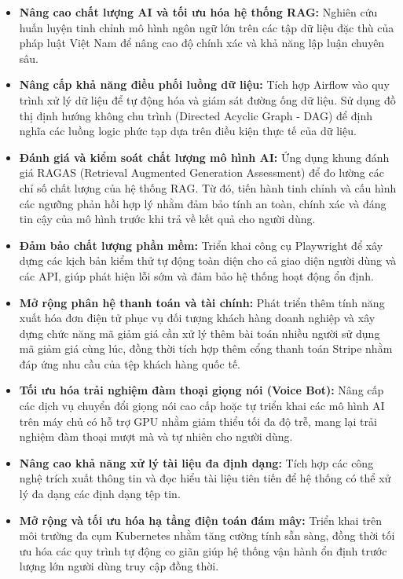 \begin{itemize}

\item \textbf{Nâng cao chất lượng AI và tối ưu hóa hệ thống RAG:}
Nghiên cứu
huấn luyện tinh chỉnh
mô hình ngôn ngữ lớn
trên các tập dữ liệu đặc thù của pháp luật Việt Nam
để nâng cao độ chính xác
và khả năng lập luận chuyên sâu.

\item \textbf{Nâng cấp khả năng điều phối luồng dữ liệu:}
Tích hợp Airflow vào quy trình xử lý dữ liệu
để tự động hóa và giám sát đường ống dữ liệu.
Sử dụng đồ thị định hướng không chu trình
(Directed Acyclic Graph - DAG)
để định nghĩa các luồng logic phức tạp dựa trên điều kiện thực tế của dữ liệu.

\item \textbf{Đánh giá và kiểm soát chất lượng mô hình AI:}
Ứng dụng khung đánh giá RAGAS
(Retrieval Augmented Generation Assessment)
để đo lường các chỉ số chất lượng của hệ thống RAG.
Từ đó, tiến hành tinh chỉnh và cấu hình các ngưỡng phản hồi
hợp lý nhằm đảm bảo tính an toàn,
chính xác và đáng tin cậy của mô hình
trước khi trả về kết quả cho người dùng.

\item \textbf{Đảm bảo chất lượng phần mềm:}
Triển khai công cụ Playwright
để xây dựng các kịch bản kiểm thử tự động
toàn diện cho cả giao diện người dùng
và các API,
giúp phát hiện lỗi sớm
và đảm bảo hệ thống hoạt động ổn định.

\item \textbf{Mở rộng phân hệ thanh toán và tài chính:}
Phát triển thêm tính năng xuất hóa đơn
điện tử phục vụ đối tượng khách hàng doanh nghiệp
và xây dựng chức năng mã giảm giá cần
xử lý thêm bài toán nhiều người
sử dụng mã giảm giá cùng lúc,
đồng thời tích hợp thêm cổng thanh toán Stripe
nhằm đáp ứng nhu cầu của tệp khách hàng quốc tế.

\item \textbf{Tối ưu hóa trải nghiệm đàm thoại giọng nói (Voice Bot):}
Nâng cấp các dịch vụ chuyển đổi giọng nói
cao cấp
hoặc tự triển khai các mô hình AI trên máy chủ có hỗ trợ GPU
nhằm giảm thiểu tối đa độ trễ, mang lại trải nghiệm đàm thoại mượt mà và tự nhiên cho người dùng.

\item \textbf{Nâng cao khả năng xử lý tài liệu đa định dạng:}
Tích hợp các công nghệ trích xuất thông tin
và đọc hiểu tài liệu tiên tiến
để hệ thống có thể xử lý đa dạng các định dạng tệp tin.

\item \textbf{Mở rộng và tối ưu hóa hạ tầng điện toán đám mây:}
Triển khai
trên môi trường đa cụm Kubernetes
nhằm tăng cường tính sẵn sàng,
đồng thời tối ưu hóa các quy trình tự động co giãn
giúp hệ thống vận hành ổn định trước lượng lớn người dùng truy cập đồng thời.


\end{itemize}
